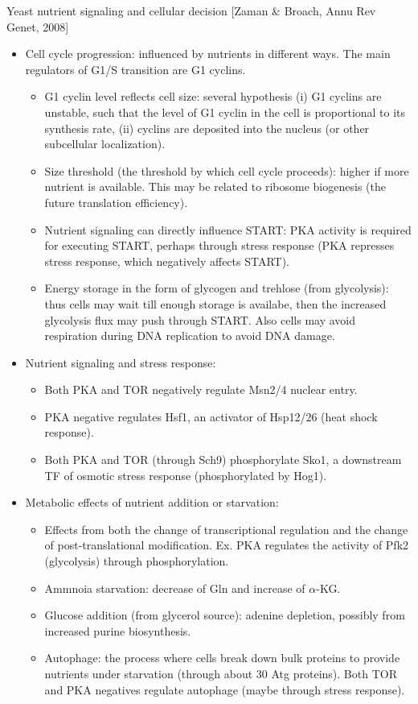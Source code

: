 \documentclass{report}
\begin{document}
Yeast nutrient signaling and cellular decision [Zaman \& Broach, Annu Rev Genet, 2008]
\begin{itemize}
\item Cell cycle progression: influenced by nutrients in different ways. The main regulators of G1/S transition are G1 cyclins. 
\begin{itemize}
	\item G1 cyclin level reflects cell size: several hypothesis (i) G1 cyclins are unstable, such that the level of G1 cyclin in the cell is proportional to its synthesis rate, (ii) cyclins are deposited into the nucleus (or other subcellular localization). 
	\item Size threshold (the threshold by which cell cycle proceeds): higher if more nutrient is available. This may be related to ribosome biogenesis (the future translation efficiency). 
	\item Nutrient signaling can directly influence START: PKA activity is required for executing START, perhaps through stress response (PKA represses stress response, which negatively affects START).
	\item Energy storage in the form of glycogen and trehlose (from glycolysis): thus cells may wait till enough storage is availabe, then the increased glycolysis flux may push through START. Also cells may avoid respiration during DNA replication to avoid DNA damage. 
\end{itemize}

\item Nutrient signaling and stress response: 
\begin{itemize}
	\item Both PKA and TOR negatively regulate Msn2/4 nuclear entry. 
	\item PKA negative regulates Hsf1, an activator of Hsp12/26 (heat shock response).
	\item Both PKA and TOR (through Sch9) phosphorylate Sko1, a downstream TF of osmotic stress response (phosphorylated by Hog1). 
\end{itemize}
	
\item Metabolic effects of nutrient addition or starvation: 
\begin{itemize}
	\item Effects from both the change of transcriptional regulation and the change of post-translational modification. Ex. PKA regulates the activity of Pfk2 (glycolysis) through phosphorylation. 
	\item Ammnoia starvation: decrease of Gln and increase of $\alpha$-KG. 
	\item Glucose addition (from glycerol source): adenine depletion, possibly from increased purine biosynthesis. 
	\item Autophage: the process where cells break down bulk proteins to provide nutrients under starvation (through about 30 Atg proteins). Both TOR and PKA negatives regulate autophage (maybe through stress response). 
\end{itemize}


\end{itemize}
\end{document}
